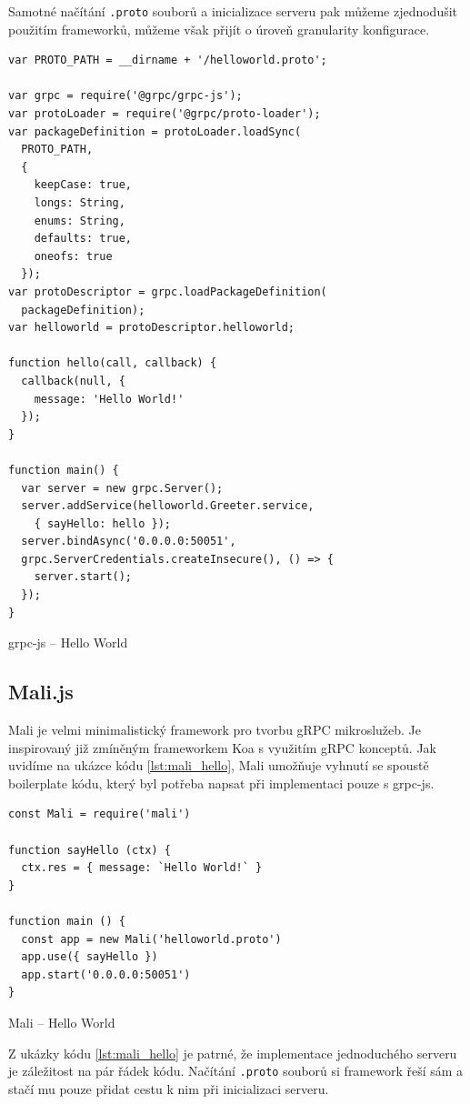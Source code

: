 \documentclass[thesis=M,czech]{FITthesis}[2019/12/23]
\begin{document}
Samotné načítání \texttt{.proto} souborů a inicializace serveru pak můžeme zjednodušit použitím frameworků, můžeme však přijít o úroveň granularity konfigurace.

\begin{listing}[h]
\begin{verbatim}
var PROTO_PATH = __dirname + '/helloworld.proto';

var grpc = require('@grpc/grpc-js');
var protoLoader = require('@grpc/proto-loader');
var packageDefinition = protoLoader.loadSync(
  PROTO_PATH,
  {
    keepCase: true,
    longs: String,
    enums: String,
    defaults: true,
    oneofs: true
  });
var protoDescriptor = grpc.loadPackageDefinition(
  packageDefinition);
var helloworld = protoDescriptor.helloworld;

function hello(call, callback) {
  callback(null, {
    message: 'Hello World!'
  });
}

function main() {
  var server = new grpc.Server();
  server.addService(helloworld.Greeter.service,
    { sayHello: hello });
  server.bindAsync('0.0.0.0:50051', 
  grpc.ServerCredentials.createInsecure(), () => {
    server.start();
  });
}
\end{verbatim}
\caption{grpc-js -- Hello World}
\label{lst:grpcjs_hello}
\end{listing}


\subsection{Mali.js}
Mali \cite{mali} je velmi minimalistický framework pro tvorbu gRPC mikroslužeb. Je inspirovaný již zmíněným frameworkem Koa s využitím gRPC konceptů. Jak uvidíme na ukázce kódu \ref{lst:mali_hello}, Mali umožňuje vyhnutí se spoustě boilerplate kódu, který byl potřeba napsat při implementaci pouze s grpc-js.

\begin{listing}[h]
\begin{verbatim}
const Mali = require('mali')

function sayHello (ctx) {
  ctx.res = { message: `Hello World!` }
}

function main () {
  const app = new Mali('helloworld.proto')
  app.use({ sayHello })
  app.start('0.0.0.0:50051')
}
\end{verbatim}
\caption{Mali -- Hello World}
\label{lst:mali_hello}
\end{listing}

Z ukázky kódu \ref{lst:mali_hello} je patrné, že implementace jednoduchého serveru je záležitost na pár řádek kódu. Načítání \texttt{.proto} souborů si framework řeší sám a stačí mu pouze přidat cestu k nim při inicializaci serveru.
\end{document}
